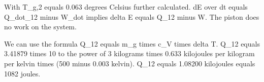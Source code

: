 With T_g,2 equals 0.063 degrees Celsius further calculated.  
dE over dt equals Q_dot_12 minus W_dot implies delta E equals Q_12 minus W.  
The piston does no work on the system.  

We can use the formula Q_12 equals m_g times c_V times delta T.  
Q_12 equals 3.41879 times 10 to the power of 3 kilograms times 0.633 kilojoules per kilogram per kelvin times (500 minus 0.003 kelvin).  
Q_12 equals 1.08200 kilojoules equals 1082 joules.